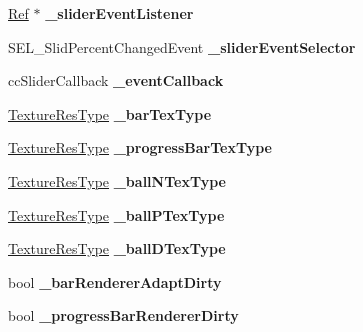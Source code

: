 \begin{DoxyCompactItemize}
\hyperlink{classRef}{Ref} $\ast$ {\bfseries \+\_\+slider\+Event\+Listener}
\item 
\mbox{\label{classui_1_1Slider_afbde6d0262402ab513c3bc24390d2560}} 
S\+E\+L\+\_\+\+Slid\+Percent\+Changed\+Event {\bfseries \+\_\+slider\+Event\+Selector}
\item 
\mbox{\label{classui_1_1Slider_a03dd5f4ef3d31382e47a11759a85fc37}} 
cc\+Slider\+Callback {\bfseries \+\_\+event\+Callback}
\item 
\mbox{\label{classui_1_1Slider_a5d2870ed288a4c87f42054e1c58146de}} 
\hyperlink{classui_1_1Widget_a040a65ec5ad3b11119b7e16b98bd9af0}{Texture\+Res\+Type} {\bfseries \+\_\+bar\+Tex\+Type}
\item 
\mbox{\label{classui_1_1Slider_aa1097ec14765131e01c1aef133629cf9}} 
\hyperlink{classui_1_1Widget_a040a65ec5ad3b11119b7e16b98bd9af0}{Texture\+Res\+Type} {\bfseries \+\_\+progress\+Bar\+Tex\+Type}
\item 
\mbox{\label{classui_1_1Slider_a74cb09b6ef48d37b28c18de32dd1d850}} 
\hyperlink{classui_1_1Widget_a040a65ec5ad3b11119b7e16b98bd9af0}{Texture\+Res\+Type} {\bfseries \+\_\+ball\+N\+Tex\+Type}
\item 
\mbox{\label{classui_1_1Slider_a3b7c98287f47892c139b48aaa4294af5}} 
\hyperlink{classui_1_1Widget_a040a65ec5ad3b11119b7e16b98bd9af0}{Texture\+Res\+Type} {\bfseries \+\_\+ball\+P\+Tex\+Type}
\item 
\mbox{\label{classui_1_1Slider_afffc0628057ccb3e49638a33d0e8e16c}} 
\hyperlink{classui_1_1Widget_a040a65ec5ad3b11119b7e16b98bd9af0}{Texture\+Res\+Type} {\bfseries \+\_\+ball\+D\+Tex\+Type}
\item 
\mbox{\label{classui_1_1Slider_a13f52b21f340df441299f096b1b8073c}} 
bool {\bfseries \+\_\+bar\+Renderer\+Adapt\+Dirty}
\item 
\mbox{\label{classui_1_1Slider_aff74839ac5168b572ff15740a846494e}} 
bool {\bfseries \+\_\+progress\+Bar\+Renderer\+Dirty}
\item 
\mbox{\label{classui_1_1Slider_a815d2c08c4d3db1e537f3cfa22d94752}} 

\end{DoxyCompactItemize}
